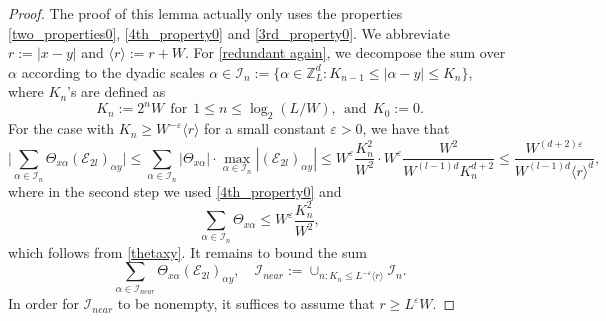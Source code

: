 \documentclass{article}
\newcommand{\1}{\mathds{1}}
\numberwithin{equation}{section}
\newcommand{\al}{\alpha}
\newcommand{\be}{\begin{equation}}
\newcommand{\ee}{\end{equation}}
\newcommand{\e}{{\varepsilon}}
\renewcommand{\cal}{\mathcal}
\renewcommand{\leq}{\leqslant}
\renewcommand{\geq}{\geqslant}
\renewcommand{\le}{\leq}
\renewcommand{\ge}{\geq}
\newcommand{\Z}{\mathbb{Z}}
\theoremstyle{plain} %
\theoremstyle{remark}
\newcommand{\Selek}{{\mathcal E}}
\begin{document}
\iffalse
\begin{proof}
	The proof of this lemma actually only uses the properties \eqref{two_properties0}, \eqref{4th_property0} and \eqref{3rd_property0}. We abbreviate $r:= |x - y|$ and $\langle r\rangle:=r+W$. For \eqref{redundant again}, we decompose the sum over $\al$ according to the dyadic scales $\al\in \cal I_{n}:=\{\al \in \Z_L^d: K_{n-1} \le |\al-y| \le K_{n}\}$, where $K_n$'s are defined as
	\be\label{defn Kn}
	K_n:= 2^n W \ \ \text{for}\ \ 1\le n \le \log_2 (L/W)  , \ \ \text{and}\ \  K_{0}:=0. 
	\ee
	For the case with $K_n\ge W^{-\e} \langle r\rangle$ for a small constant $\e>0$, we have that
	\be\label{boundIfar} \Big| \sum_{\al\in \cal I_{n}}\Theta_{ x \al} (\Selek_{2l})_{\al y}\Big| \le   \sum_{\al\in \cal I_{n}}\left|\Theta_{ x \al}\right| \cdot \max_{\al\in \cal I_n} \left|(\Selek_{2l})_{\al y}\right| \le W^\e\frac{K_n^2}{W^2} \cdot W^\e\frac{W^2}{W^{(l-1)d} K_n^{d+2}}\le \frac{W^{(d+2)\e}}{W^{(l-1)d} \langle r\rangle^{d}},\ee
	where in the second step we used \eqref{4th_property0} and
	$$\sum_{\al\in \cal I_{n}}\Theta_{ x \al}\le W^\e \frac{K_n^2}{W^2},$$
	which follows from \eqref{thetaxy}. It remains to bound the sum
	$$\sum_{\al\in \cal I_{near}}\Theta_{x \al} (\Selek_{2l})_{\al y},\quad \cal I_{near}:=\cup_{n: K_n \le L^{-\e}\langle r\rangle } \cal I_n .$$
	In order for $\cal I_{near}$ to be nonempty, it suffices to assume that $r\ge L^\e W$. 
	

\end{proof}
\end{document}
